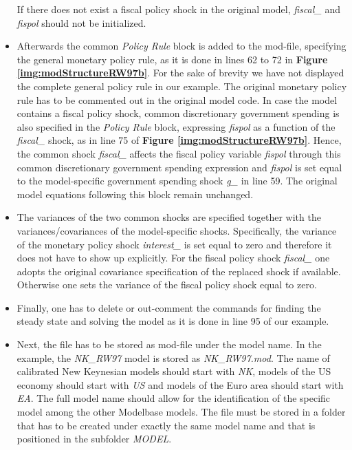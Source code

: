 \begin{itemize}
If there does not exist a fiscal policy shock in the original model, \textit{fiscal\_} and \textit{fispol} should not be initialized.
\item Afterwards the common \textit{Policy Rule} block is added to the mod-file, specifying the general monetary policy rule, as it is done in lines 62 to 72 in {\bf Figure \ref{img:modStructureRW97b}}. For the sake of brevity we have not displayed the complete general policy rule in our example. The original monetary policy rule has to be commented out in the original model code. In case the model contains a fiscal policy shock, common discretionary government spending is also specified in the \textit{Policy Rule} block, expressing \textit{fispol} as a function of the \textit{fiscal\_} shock, as in line 75 of {\bf Figure \ref{img:modStructureRW97b}}. Hence, the common shock \textit{fiscal\_} affects the fiscal policy
variable \textit{fispol} through this common discretionary government spending expression and \textit{fispol} is set equal to the model-specific
government spending shock \textit{g\_} in line 59. The original model equations following this block remain unchanged.
\item The variances of the two common shocks are specified together with the variances/covariances of the model-specific shocks. Specifically, the variance of the monetary policy shock \textit{interest\_} is set equal to zero and therefore it does not have to show up explicitly. For the fiscal policy shock \textit{fiscal\_} one adopts the original covariance specification of the replaced shock if available. Otherwise one sets the variance of the fiscal policy shock equal to zero.
\item Finally, one has to delete or out-comment the commands for finding the steady state and solving the model as it is done in line 95 of our example.

%
\end{itemize}


\begin{itemize}
\item Next, the file has to be stored as mod-file under the model name. In the example, the \textit{NK\_RW97} model is stored as \textit{NK\_RW97.mod}. The name of calibrated New Keynesian models should start with \textit{NK}, models of the US economy should start with \textit{US} and models of the Euro area should start with \textit{EA}. The full model name should allow for the identification of the specific model among the other Modelbase models. The file must be stored in a folder that has to be created under exactly the same model name and that is positioned in the subfolder \textit{MODEL}.
\end{itemize}

